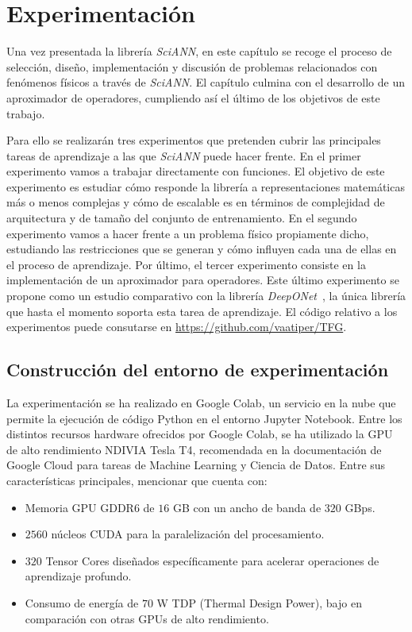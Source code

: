 \chapter{Experimentación}\label{ch:octavo-capitulo}
Una vez presentada la librería \textit{SciANN}, en este capítulo se recoge el proceso de selección, diseño, implementación y discusión de problemas relacionados con fenómenos físicos a través de \textit{SciANN}. El capítulo culmina con el desarrollo de un aproximador de operadores, cumpliendo así el último de los objetivos de este trabajo. 

Para ello se realizarán tres experimentos que pretenden cubrir las principales tareas de aprendizaje a las que \textit{SciANN} puede hacer frente. En el primer experimento vamos a trabajar directamente con funciones. El objetivo de este experimento es estudiar cómo responde la librería a representaciones matemáticas más o menos complejas y cómo de escalable es en términos de complejidad de arquitectura y de tamaño del conjunto de entrenamiento. En el segundo experimento vamos a hacer frente a un problema físico propiamente dicho, estudiando las restricciones que se generan y cómo influyen cada una de ellas en el proceso de aprendizaje. Por último, el tercer experimento consiste en la implementación de un aproximador para operadores. Este último experimento se propone como un estudio comparativo con la librería \textit{DeepONet}~\cite{lu2024deeponet}, la única librería que hasta el momento soporta esta tarea de aprendizaje. El código relativo a los experimentos puede consutarse en \hyperlink{https://github.com/vaatiper/TFG}{https://github.com/vaatiper/TFG}.


\section{Construcción del entorno de experimentación}

La experimentación se ha realizado en Google Colab, un servicio en la nube que permite la ejecución de código Python en el entorno Jupyter Notebook. Entre los distintos recursos hardware ofrecidos por Google Colab, se ha utilizado la GPU de alto rendimiento NDIVIA Tesla T4, recomendada en la documentación de Google Cloud para tareas de Machine Learning y Ciencia de Datos. Entre sus características principales, mencionar que cuenta con:
\begin{itemize}
    \item Memoria GPU GDDR6 de $16$ GB con un ancho de banda de $320$ GBps. 
    \item $2560$ núcleos CUDA para la paralelización del procesamiento.
    \item $320$ Tensor Cores diseñados específicamente para acelerar operaciones de aprendizaje profundo.
    \item Consumo de energía de $70$ W TDP (Thermal Design Power), bajo en comparación con otras GPUs de alto rendimiento. 
    
\end{itemize}


